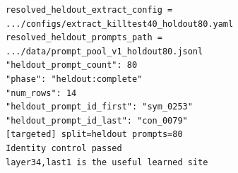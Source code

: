 \begin{verbatim}
resolved_heldout_extract_config = .../configs/extract_killtest40_holdout80.yaml
resolved_heldout_prompts_path = .../data/prompt_pool_v1_holdout80.jsonl
"heldout_prompt_count": 80
"phase": "heldout:complete"
"num_rows": 14
"heldout_prompt_id_first": "sym_0253"
"heldout_prompt_id_last": "con_0079"
[targeted] split=heldout prompts=80
Identity control passed
layer34,last1 is the useful learned site
\end{verbatim}
